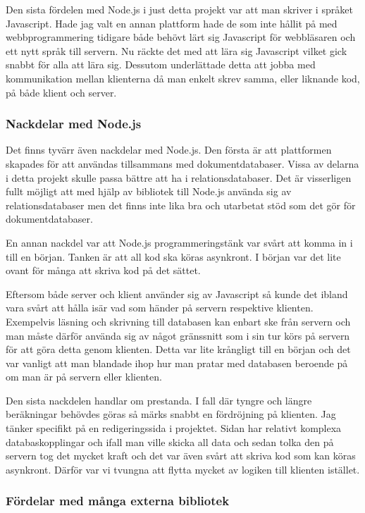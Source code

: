 Den sista fördelen med Node.js i just detta projekt var att man skriver i språket Javascript. Hade jag valt en annan plattform hade de som inte hållit på med webbprogrammering tidigare både behövt lärt sig Javascript för webbläsaren och ett nytt språk till servern. Nu räckte det med att lära sig Javascript vilket gick snabbt för alla att lära sig. Dessutom underlättade detta att jobba med kommunikation mellan klienterna då man enkelt skrev samma, eller liknande kod, på både klient och server.

\subsubsection{Nackdelar med Node.js}

Det finns tyvärr även nackdelar med Node.js. Den första är att plattformen skapades för att användas tillsammans med dokumentdatabaser. Vissa av delarna i detta projekt skulle passa bättre att ha i relationsdatabaser. Det är visserligen fullt möjligt att med hjälp av bibliotek till Node.js använda sig av relationsdatabaser men det finns inte lika bra och utarbetat stöd som det gör för dokumentdatabaser.

En annan nackdel var att Node.js programmeringstänk var svårt att komma in i till en början. Tanken är att all kod ska köras asynkront. I början var det lite ovant för många att skriva kod på det sättet. 

Eftersom både server och klient använder sig av Javascript så kunde det ibland vara svårt att hålla isär vad som händer på servern respektive klienten. Exempelvis läsning och skrivning till databasen kan enbart ske från servern och man måste därför använda sig av något gränssnitt som i sin tur körs på servern för att göra detta genom klienten. Detta var lite krångligt till en början och det var vanligt att man blandade ihop hur man pratar med databasen beroende på om man är på servern eller klienten.

Den sista nackdelen handlar om prestanda. I fall där tyngre och längre beräkningar behövdes göras så märks snabbt en fördröjning på klienten. Jag tänker specifikt på en redigeringssida i projektet. Sidan har relativt komplexa databaskopplingar och ifall man ville skicka all data och sedan tolka den på servern tog det mycket kraft och det var även svårt att skriva kod som kan köras asynkront. Därför var vi tvungna att flytta mycket av logiken till klienten istället.

\subsubsection{Fördelar med många externa bibliotek} 

